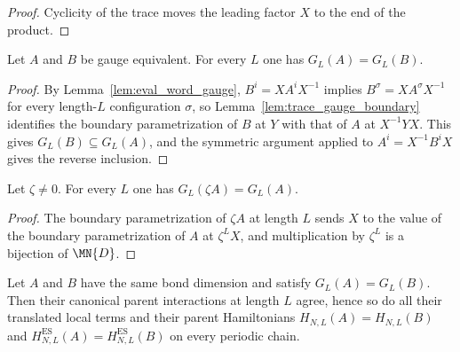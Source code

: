 \begin{proof}
    \leanok
    Cyclicity of the trace moves the leading factor $X$ to the end of the
    product.
\end{proof}

\begin{lemma}
    \label{thm:local_ground_space_gauge_invariance}
    \leanok
    Let $A$ and $B$ be gauge equivalent.  For every $L$ one has
    $G_L(A)=G_L(B)$.
\end{lemma}

\begin{proof}
    \leanok
    By Lemma~\ref{lem:eval_word_gauge}, $B^i=XA^iX^{-1}$ implies
    $B^\sigma=XA^\sigma X^{-1}$ for every length-$L$ configuration $\sigma$, so
    Lemma~\ref{lem:trace_gauge_boundary} identifies the boundary
    parametrization of $B$ at $Y$ with that of $A$ at $X^{-1}YX$.  This gives
    $G_L(B)\subseteq G_L(A)$, and the symmetric argument applied to
    $A^i=X^{-1}B^iX$ gives the reverse inclusion.
\end{proof}

\begin{lemma}
    \label{thm:local_ground_space_rescaling}
    \leanok
    Let $\zeta\neq0$.  For every $L$ one has $G_L(\zeta A)=G_L(A)$.
\end{lemma}

\begin{proof}
    \leanok
    The boundary parametrization of $\zeta A$ at length $L$ sends $X$ to the
    value of the boundary parametrization of $A$ at $\zeta^{L}X$, and
    multiplication by $\zeta^{L}$ is a bijection of $\MN{D}$.
\end{proof}

\begin{lemma}
    \label{thm:parent_hamiltonian_from_ground_space}
    \leanok
    Let $A$ and $B$ have the same bond dimension and satisfy $G_L(A)=G_L(B)$.
    Then their canonical parent interactions at length $L$ agree, hence so do
    all their translated local terms and their parent Hamiltonians
    $H_{N,L}(A)=H_{N,L}(B)$ and $H_{N,L}^{\mathrm{ES}}(A)
        =H_{N,L}^{\mathrm{ES}}(B)$ on every periodic chain.
\end{lemma}

